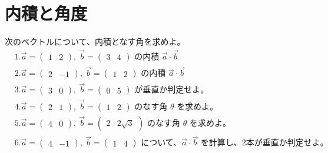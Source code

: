 \documentclass[paper=b4j,landscape,twocolumn,fleqn]{jlreq}
\begin{document}
\section{内積と角度}
次のベクトルについて、内積となす角を求めよ。
\begin{align*}
　&1.　\vec{a}=\begin{pmatrix}1 & 2\end{pmatrix},\ \vec{b}=\begin{pmatrix}3 & 4\end{pmatrix}\text{ の内積 }\vec{a}\cdot\vec{b}\\[0.45em]
　&2.　\vec{a}=\begin{pmatrix}2 & -1\end{pmatrix},\ \vec{b}=\begin{pmatrix}1 & 2\end{pmatrix}\text{ の内積 }\vec{a}\cdot\vec{b}\\[0.45em]
　&3.　\vec{a}=\begin{pmatrix}3 & 0\end{pmatrix},\ \vec{b}=\begin{pmatrix}0 & 5\end{pmatrix}\text{ が垂直か判定せよ。}\\[0.45em]
　&4.　\vec{a}=\begin{pmatrix}2 & 1\end{pmatrix},\ \vec{b}=\begin{pmatrix}1 & 2\end{pmatrix}\text{ のなす角 }\theta\text{ を求めよ。}\\[0.45em]
　&5.　\vec{a}=\begin{pmatrix}4 & 0\end{pmatrix},\ \vec{b}=\begin{pmatrix}2 & 2\sqrt{3}\end{pmatrix}\text{ のなす角 }\theta\text{ を求めよ。}\\[0.45em]
　&6.　\vec{a}=\begin{pmatrix}4 & -1\end{pmatrix},\ \vec{b}=\begin{pmatrix}1 & 4\end{pmatrix}\text{ について、}\vec{a}\cdot\vec{b}\text{ を計算し、2本が垂直か判定せよ。}\\[0.45em]
\end{align*}
\end{document}
